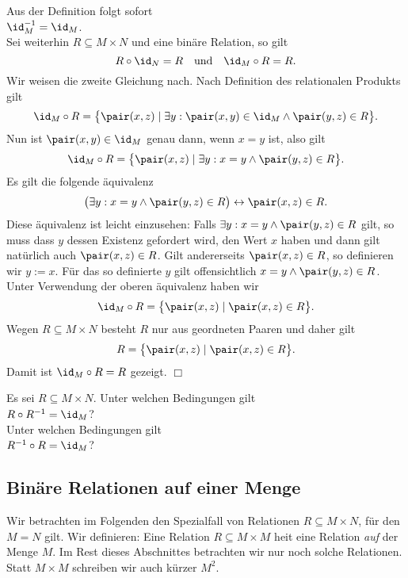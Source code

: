\noindent
Aus der Definition folgt sofort \\[0.2cm]
\hspace*{1.3cm} $\id_M^{-1} = \id_M$. \\[0.2cm]
Sei weiterhin $R \subseteq M \times N$ und eine bin\"{a}re Relation, so
gilt 
\[ R \circ \id_N = R \quad \mbox{und} \quad \id_M \circ R = R. \] 
Wir weisen die zweite Gleichung nach.  Nach Definition des relationalen Produkts
gilt
\[ \id_M \circ R = \bigl\{ \pair(x,z) \mid \exists y: \pair(x,y) \in \id_M \wedge \pair(y,z) \in R \bigr\}. \]
Nun ist $\pair(x,y) \in \id_M$ genau dann, wenn $x = y$ ist, also gilt
\[ \id_M \circ R = \bigl\{ \pair(x,z) \mid \exists y: x = y \wedge \pair(y,z) \in R \bigr\}. \]
Es gilt die folgende \"{a}quivalenz
\[ \bigl( \exists y: x = y \wedge \pair(y,z) \in R \bigr) \leftrightarrow \pair(x,z) \in R. \]
Diese \"{a}quivalenz ist leicht einzusehen:  Falls $\exists y: x = y \wedge \pair(y,z) \in R$
gilt, so muss dass $y$ dessen Existenz gefordert wird, den Wert $x$ haben und dann gilt
nat\"{u}rlich auch $\pair(x,z) \in R$.  Gilt andererseits $\pair(x,z) \in R$, so definieren
wir $y := x$.  F\"{u}r das so definierte $y$ gilt offensichtlich 
$x = y \wedge \pair(y,z) \in R$.  Unter Verwendung der oberen \"{a}quivalenz haben wir 
\[ \id_M \circ R = \bigl\{ \pair(x,z) \mid \pair(x,z) \in R \bigr\}. \]
Wegen  $R \subseteq M \times N$ besteht $R$ nur aus geordneten
Paaren und daher gilt
\[ R = \bigl\{ \pair(x,z) \mid \pair(x,z) \in R \bigr\}. \]
Damit ist $\id_M \circ R = R$ gezeigt. \hspace*{\fill} $\Box$

\exercise
Es sei $R \subseteq M \times N$.  Unter welchen Bedingungen gilt 
\\[0.2cm]
\hspace*{1.3cm}
$R \circ R^{-1} = \id_M$? 
\\[0.2cm]
Unter welchen Bedingungen gilt
\\[0.2cm]
\hspace*{1.3cm}
$R^{-1} \circ R = \id_M$?
\eox



\subsection{Bin\"{a}re Relationen auf einer Menge}
Wir betrachten im Folgenden den Spezialfall von Relationen $R \subseteq M \times N$, f\"{u}r
den $M = N$ gilt.  Wir definieren:
Eine Relation $R \subseteq M \times M$ hei\3t eine Relation \emph{auf} der Menge $M$.
Im Rest dieses Abschnittes betrachten wir nur noch solche Relationen. 
Statt $M \times M$ schreiben wir auch k\"{u}rzer $M^2$.

